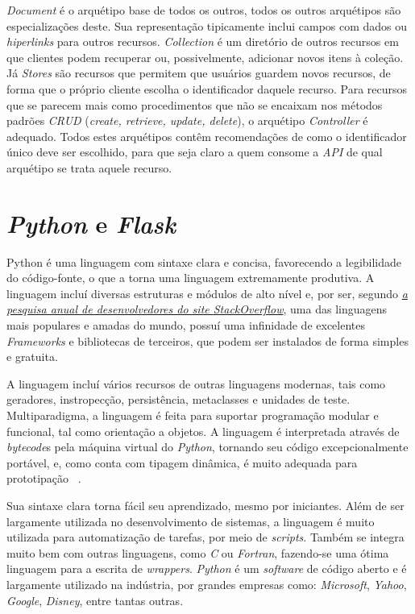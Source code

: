 \emph{Document} é o arquétipo base de todos os outros, todos os outros arquétipos são especializações 
deste. Sua representação tipicamente inclui campos com dados ou \emph{hiperlinks} para outros 
recursos. \emph{Collection} é um diretório de outros recursos em que clientes podem recuperar 
ou, possivelmente, adicionar novos itens à coleção. Já \emph{Stores} são recursos que permitem 
que usuários guardem novos recursos, de forma que o próprio cliente escolha o 
identificador daquele recurso. Para recursos que se parecem mais como procedimentos que 
não se encaixam nos métodos padrões \emph{CRUD} (\emph{create, retrieve, update, delete}),
  o arquétipo \emph{Controller} é adequado. Todos estes arquétipos 
  contêm recomendações de como o identificador único deve ser escolhido, para que seja 
  claro a quem consome a \emph{API} de qual arquétipo se trata aquele recurso.

  \section{\emph{Python} e \emph{Flask}}
  Python é uma linguagem com sintaxe clara e concisa, favorecendo a legibilidade do 
  código-fonte, o que a torna uma linguagem extremamente produtiva. A linguagem incluí 
  diversas estruturas e módulos de alto nível e, por ser,
  segundo \hyperref[link:so_survey]{\emph{a pesquisa anual de desenvolvedores 
      do site \emph{StackOverflow}}},
  uma das linguagens mais populares e amadas do mundo, possuí uma infinidade 
  de excelentes \emph{Frameworks} e bibliotecas de terceiros, que podem ser instalados 
  de forma simples e gratuita. 

  A linguagem incluí vários recursos de outras linguagens 
  modernas, tais como geradores, instropecção, persistência, metaclasses e unidades de 
  teste. Multiparadigma,
  a linguagem é feita para suportar programação modular e funcional, 
  tal como orientação a objetos.
  A linguagem é interpretada através de 
  \emph{bytecode}s pela máquina virtual do \emph{Python}, tornando seu código 
  excepcionalmente portável, e, como conta com tipagem dinâmica, é muito adequada 
  para prototipação \ \cite{borges2014python}. 

  Sua sintaxe clara torna fácil seu aprendizado, mesmo por iniciantes. 
  Além de ser largamente utilizada no desenvolvimento de sistemas, a linguagem é muito utilizada 
  para automatização de tarefas, por meio de \emph{scripts}. Também se integra 
  muito bem com outras linguagens, como \emph{C} ou \emph{Fortran}, fazendo-se 
  uma ótima linguagem para a escrita de \emph{wrappers}. \emph{Python} é um 
  \emph{software} de código aberto e é largamente utilizado na indústria, 
  por grandes empresas como: \emph{Microsoft}, \emph{Yahoo}, \emph{Google}, \emph{Disney}, 
  entre tantas outras.

